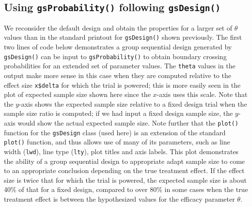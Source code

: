 \subsection{Using \texttt{gsProbability()} following \texttt{gsDesign()}}

We reconsider the default design and obtain the properties for a larger
set of $\theta$ values than in the standard printout for \texttt{gsDesign()} shown previously.
The first two lines of code below demonstrates a group sequential design generated by \texttt{gsDesign()} can be input to \texttt{gsProbability()} to obtain boundary crossing probabilities for an extended set of parameter values.
The \texttt{theta} values in the output make more sense in this case when they are computed relative to the effect size \texttt{x\$delta} for which the trial is powered; this is more easily seen in the plot of expected sample size shown here since the $x$-axis uses this scale. 
Note that the $y$-axis shows the expected sample size relative to a fixed design trial when the sample size ratio is computed; if we had input a fixed design sample size, the $y$-axis would show the actual expected sample size.
Note further that the \texttt{plot()} function for the \texttt{gsDesign} class (used here) is an extension of the standard \texttt{plot()} function, and thus allows use of many of its parameters, such as line width (\texttt{lwd}), line type (\texttt{lty}), plot titles and axis labels.
This plot demonstrates the ability of a group sequential design to appropriate adapt sample size to come to an appropriate conclusion depending on the true treatment effect. If the effect size is twice that for which the trial is powered, the expected sample size is about 40\% of that for a fixed design, compared to over 80\% in some cases when the true treatment effect is between the hypothesized values for the efficacy parameter $\theta$. 

